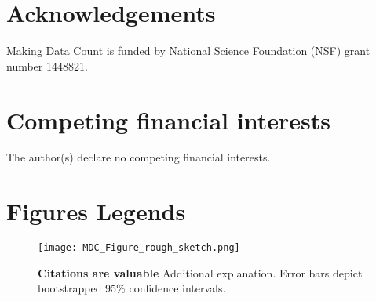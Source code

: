 \documentclass[english]{article}
\begin{document}
\section*{Acknowledgements}

Making Data Count is funded by National Science Foundation (NSF) grant number 1448821.




\section*{Competing financial interests}


The author(s) declare no competing financial interests.


\section*{Figures Legends}



\begin{figure}[!ht]
\begin{center}
\texttt{[image: MDC\_Figure\_rough\_sketch.png]}
\end{center}
\caption{
{\bf Citations are valuable}
Additional explanation.
Error bars depict bootstrapped 95\% confidence intervals. 
}
\label{fig:results}
\end{figure}

\end{document}
